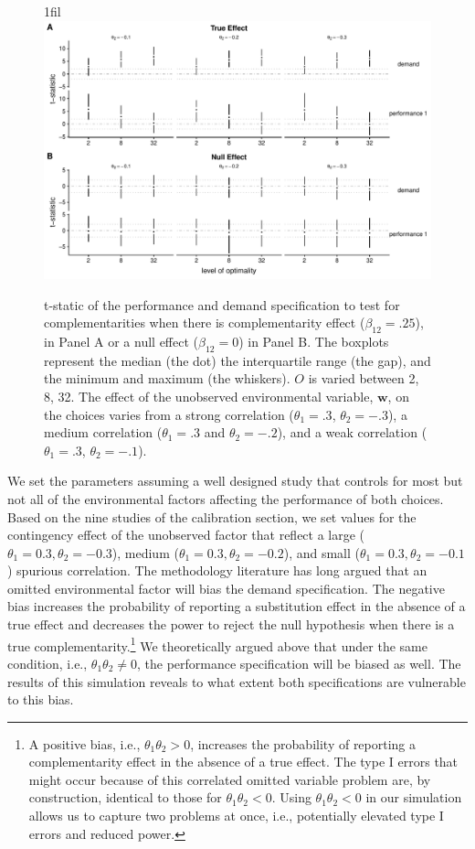 \documentclass[12pt]{article}
\makeatletter
\newcommand*{\centerfloat}{%
  \parindent \z@
  \leftskip \z@ \@plus 1fil \@minus \textwidth
  \rightskip\leftskip
  \parfillskip \z@skip}
\makeatother
\begin{document}
\begin{figure}
\centerfloat
\includegraphics[width=450px]{figure-latex/spurious_new_plot.pdf}
\caption[Error Rate and Power with Unobserved Environmental Variables]
{\label{spurious} t-static of the performance and demand specification to test
for complementarities when there is complementarity effect ($\beta_{12} = .25$),
in Panel A or a null effect ($\beta_{12} = 0$) in Panel B. The boxplots represent the median (the dot) the interquartile range (the gap), and the minimum and maximum (the whiskers). $O$ is varied between 2, 8, 32. The effect of the unobserved environmental variable, $\mathbf{w}$, on the choices varies from a strong correlation ($\theta_1 = .3$, $\theta_2 = -.3$), a medium correlation ($\theta_1 = .3$ and $\theta_2 = -.2$), and a weak correlation ($\theta_1 =.3$, $\theta_2 = -.1$).}
\end{figure}



We set the parameters assuming a well designed study that controls for most but not all of the environmental factors affecting the performance of both choices. Based on the nine studies of the calibration section, we set values for the contingency effect of the unobserved factor that reflect a large ($\theta_1 = 0.3, \theta_2 = -0.3$), medium ($\theta_1 = 0.3, \theta_2 = -0.2$), and small ($\theta_1 = 0.3, \theta_2 = -0.1$) spurious correlation. The methodology literature has long argued that an omitted environmental factor will bias the demand specification. The negative bias increases the probability of reporting a substitution effect in the absence of a true effect and decreases the power to reject the null hypothesis when there is a true complementarity.\footnote{A positive bias, i.e., $\theta_1 \theta_2 > 0$, increases the probability of reporting a complementarity effect in the absence of a true effect. The type I errors that might occur because of this correlated omitted variable problem are, by construction, identical to those for $\theta_1 \theta_2 < 0$. Using $\theta_1 \theta_2 < 0$ in our simulation allows us to capture two problems at once, i.e., potentially elevated type I errors and reduced power.}  We theoretically argued above that under the same condition, i.e., $\theta_1 \theta_2 \neq 0$, the performance specification will be biased as well. The results of this simulation reveals to what extent both specifications are vulnerable to this bias.
\end{document}
